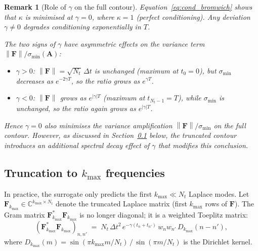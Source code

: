 \documentclass[11pt, a4paper]{article}
\newtheorem{remark}[theorem]{Remark}
\newcommand{\norm}[1]{\left\|#1\right\|}
\begin{document}
\begin{remark}[Role of $\gamma$ on the full contour]
  \label{rem:gamma_full}
  Equation~\eqref{eq:cond_bromwich} shows that $\kappa$ is minimised at
  $\gamma = 0$, where $\kappa = 1$ (perfect conditioning). Any deviation
  $\gamma \neq 0$ degrades conditioning exponentially in $T$.
 
  The two signs of $\gamma$ have \emph{asymmetric} effects on the
  variance term $\norm{\mathbf{F}}/\sigma_{\min}(\mathbf{A})$:
  \begin{itemize}
    \item $\gamma > 0$: $\norm{\mathbf{F}} = \sqrt{N_t}\,\Delta t$ is
          unchanged (maximum at $t_0 = 0$), but $\sigma_{\min}$ decreases
          as $e^{-2\gamma T}$, so the ratio grows as $e^{\gamma T}$.
    \item $\gamma < 0$: $\norm{\mathbf{F}}$ grows as $e^{|\gamma|T}$
          (maximum at $t_{N_t-1} = T$), while $\sigma_{\min}$ is unchanged,
          so the ratio again grows as $e^{|\gamma|T}$.
  \end{itemize}
  Hence $\gamma = 0$ also minimises the variance amplification
  $\norm{\mathbf{F}}/\sigma_{\min}$ on the full contour.
  However, as discussed in Section~\ref{sec:trunc} below, the truncated
  contour introduces an additional spectral decay effect of $\gamma$ that
  modifies this conclusion.
\end{remark}
 
\subsection{Truncation to $k_{\max}$ frequencies}
\label{sec:trunc}
 
In practice, the surrogate only predicts the first $k_{\max} \ll N_t$
Laplace modes. Let $\mathbf{F}_{k_{\max}} \in \mathbb{C}^{k_{\max}\times N_t}$
denote the truncated Laplace matrix (first $k_{\max}$ rows of $\mathbf{F}$).
The Gram matrix $\mathbf{F}_{k_{\max}}^*\mathbf{F}_{k_{\max}}$ is no longer
diagonal; it is a weighted Toeplitz matrix:
\begin{equation}
  \label{eq:gram_truncated}
  \left(\mathbf{F}_{k_{\max}}^*\mathbf{F}_{k_{\max}}\right)_{n,n'}
  \;=\; N_t\,\Delta t^2\, e^{-\gamma(t_n+t_{n'})}\,w_n w_{n'}\,
        D_{k_{\max}}(n - n'),
\end{equation}
where $D_{k_{\max}}(m) = \sin(\pi k_{\max} m/N_t)\,/\,\sin(\pi m/N_t)$
is the Dirichlet kernel.
 
\end{document}
